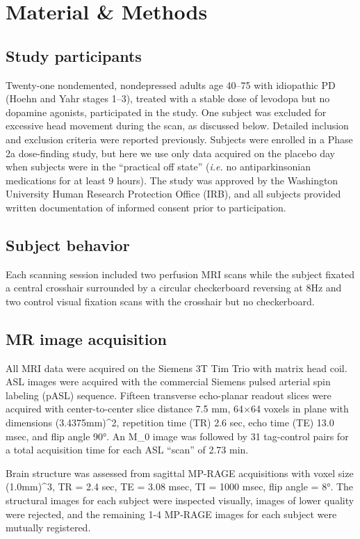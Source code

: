 \section{Material \& Methods}

\subsection{Study participants}
Twenty-one nondemented, nondepressed adults age 40–75 with idiopathic PD (Hoehn and Yahr stages 1–3),\cite{6067254} treated with a stable dose of levodopa but no dopamine agonists, participated in the study. One subject was excluded for excessive head movement during the scan, as discussed below. Detailed inclusion and exclusion criteria were reported previously.\cite{SYN115_2010_AAN_RCT} Subjects were enrolled in a Phase 2a dose-finding study,\cite{Black_2010} but here we use only data acquired on the placebo day when subjects were in the ``practical off state'' (\textit{i.e.} no antiparkinsonian medications for at least 9 hours). The study was approved by the Washington University Human Research Protection Office (IRB), and all subjects provided written documentation of informed consent prior to participation.

\subsection{Subject behavior}
Each scanning session included two perfusion MRI scans while the subject fixated a central crosshair surrounded by a circular checkerboard reversing at 8Hz and two control visual fixation scans with the crosshair but no checkerboard. 

\subsection{MR image acquisition}
All MRI data were acquired on the Siemens 3T Tim Trio with matrix head coil. ASL images were acquired with the commercial Siemens pulsed arterial spin labeling (pASL) sequence.\cite{Wang_2003} Fifteen transverse echo-planar readout slices were acquired with center-to-center slice distance 7.5 mm, 64$\times$64 voxels in plane with dimensions (3.4375mm)^{2}, repetition time (TR) 2.6 sec, echo time (TE) 13.0 msec, and flip angle 90°. An M_0 image was followed by 31 tag-control pairs for a total acquisition time for each ASL ``scan'' of 2.73 min.

Brain structure was assessed from sagittal MP-RAGE acquisitions with voxel size (1.0mm)^{3}, TR = 2.4 sec, TE = 3.08 msec, TI = 1000 msec, flip angle = 8°. The structural images for each subject were inspected visually, images of lower quality were rejected, and the remaining 1-4 MP-RAGE images for each subject were mutually registered.

